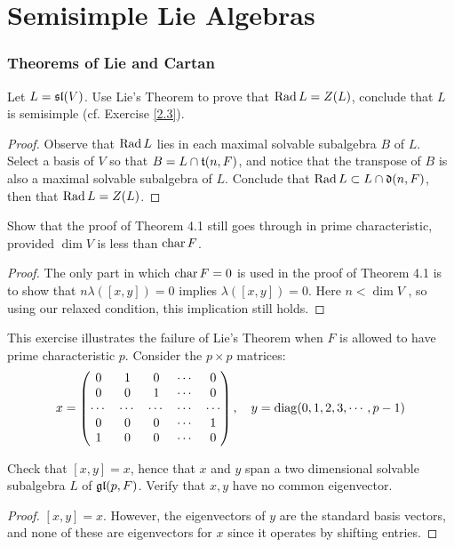 \part{Semisimple Lie Algebras}
\section{Theorems of Lie and Cartan}



\begin{ex}\label{4.1}
  Let $L = \sl(V )$. Use Lie's Theorem to prove that $\Rad L = Z(L)$, conclude that $L$ is semisimple (cf. Exercise \ref{2.3}).
\end{ex}
\begin{proof}
    Observe that $\Rad L$ lies in each maximal solvable subalgebra $B$ of $L$. Select a basis of $V$ so that $B = L\cap\tt(n,F)$, and notice that the transpose of $B$ is also a maximal solvable subalgebra of $L$. Conclude that $\Rad L \subset L\cap\dd(n,F)$, then that $\Rad L = Z(L)$.
\end{proof}

\begin{ex}
  Show that the proof of Theorem 4.1 still goes through in prime characteristic, provided $\dim V$ is less than $\Char F$.
\end{ex}
\begin{proof}
  The only part in which $\Char F = 0$ is used in the proof of Theorem 4.1 is to show that $n\lambda([x,y]) = 0$ implies $\lambda([x,y]) = 0$. Here $n < \dim V$ , so using our relaxed condition, this implication still holds.
\end{proof}

\begin{ex}\label{4.3}
  This exercise illustrates the failure of Lie's Theorem when $F$ is allowed to have prime characteristic $p$. Consider the $p \times p$ matrices:
  \begin{equation*}
    x=\begin{pmatrix}
        0 & 1 & 0 & \cdots & 0 \\
        0 & 0 & 1 & \cdots & 0 \\
        \cdots & \cdots & \cdots & \cdots & \cdots \\
        0 & 0 & 0 & \cdots & 1 \\
        1 & 0 & 0 & \cdots & 0 \\
      \end{pmatrix},
      \quad y=\diag(0,1,2,3,\cdots,p-1)
  \end{equation*}

  Check that $[x, y] = x$, hence that $x$ and $y$ span a two dimensional solvable subalgebra $L$ of $\gl(p, F)$. Verify that $x, y$ have no common eigenvector.
\end{ex}
\begin{proof}
  $[x, y] = x$. However, the eigenvectors of $y$ are the standard basis vectors, and none of these are eigenvectors for $x$ since it operates by shifting entries.
\end{proof}

